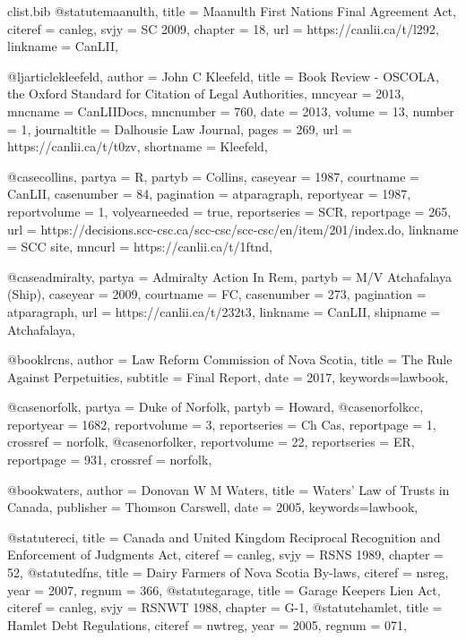 \begin{filecontents*}[overwrite]{clist\jobname.bib}
@statute{maanulth,	title =  {Maanulth First Nations Final Agreement Act},	citeref =  {canleg},	svjy =  {SC 2009},	chapter =  {18},			url =  {https://canlii.ca/t/l292},	linkname =  {CanLII},							}

@ljarticle{kleefeld,	author =  {John C Kleefeld},	title =  {Book Review - OSCOLA, the Oxford Standard for Citation of Legal Authorities},		mncyear =  {2013},	mncname =  {CanLIIDocs},	mncnumber =  {760},	date =  {2013},	volume =  {13},	number =  {1},	journaltitle =  {Dalhousie Law Journal},	pages =  {269},	url =  {https://canlii.ca/t/t0zv},	shortname =  {Kleefeld},		}

@case{collins,	partya =  {R},	partyb =  {Collins},		caseyear =  {1987},	courtname =  {CanLII},	casenumber =  {84},	pagination =  {atparagraph},	reportyear =  {1987},	reportvolume =  {1},	volyearneeded =  {true},	reportseries =  {SCR},	reportpage =  {265},	url =  {https://decisions.scc-csc.ca/scc-csc/scc-csc/en/item/201/index.do},	linkname =  {SCC site},	mncurl =  {https://canlii.ca/t/1ftnd},											}

@case{admiralty,	partya =  {Admiralty Action In Rem},	partyb =  {M/V Atchafalaya (Ship)},		caseyear =  {2009},	courtname =  {FC},	casenumber =  {273},	pagination =  {atparagraph},						url =  {https://canlii.ca/t/232t3},	linkname =  {CanLII},										shipname =  {Atchafalaya},		}


@book{lrcns,	author =  {{Law Reform Commission of Nova Scotia}},		title =  {The Rule Against Perpetuities},	subtitle =  {Final Report},			date =  {2017},	keywords={lawbook},						}

@case{norfolk,	partya =  {Duke of Norfolk},	partyb =  {Howard},																							}
@case{norfolkcc,								reportyear =  {1682},	reportvolume =  {3},		reportseries =  {Ch Cas},	reportpage =  {1},												crossref =  {norfolk},	}
@case{norfolker,									reportvolume =  {22},		reportseries =  {ER},	reportpage =  {931},												crossref =  {norfolk},	}


@book{waters,	author =  {Donovan W M Waters},		title =  {Waters' Law of Trusts in Canada},			publisher =  {Thomson Carswell},	date =  {2005},	keywords={lawbook},						}

@statute{reci,	title =  {Canada and United Kingdom Reciprocal Recognition and Enforcement of Judgments Act},	citeref =  {canleg},	svjy =  {RSNS 1989},	chapter =  {52},											}
@statute{dfns,	title =  {Dairy Farmers of Nova Scotia By-laws},	citeref =  {nsreg},			year =  {2007},	regnum =  {366},									}
@statute{garage,	title =  {Garage Keepers Lien Act},	citeref =  {canleg},	svjy =  {RSNWT 1988},	chapter =  {G-1},											}
@statute{hamlet,	title =  {Hamlet Debt Regulations},	citeref =  {nwtreg},			year =  {2005},	regnum =  {071},									}



\end{filecontents*}
